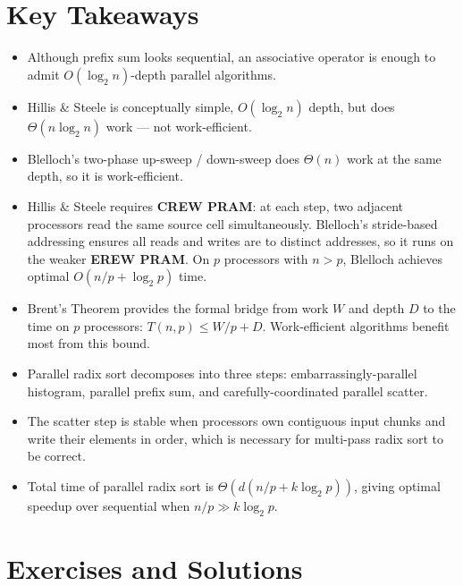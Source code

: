 \section{Key Takeaways}
\begin{itemize}[leftmargin=*]
  \item Although prefix sum looks sequential, an associative operator
        is enough to admit $O(\log_2 n)$-depth parallel algorithms.
  \item Hillis \& Steele is conceptually simple, $O(\log_2 n)$ depth,
        but does $\Theta(n \log_2 n)$ work --- not work-efficient.
  \item Blelloch's two-phase up-sweep / down-sweep does $\Theta(n)$
        work at the same depth, so it is work-efficient.
  \item Hillis \& Steele requires \textbf{CREW PRAM}: at each step,
        two adjacent processors read the same source cell simultaneously.
        Blelloch's stride-based addressing ensures all reads and writes
        are to distinct addresses, so it runs on the weaker \textbf{EREW PRAM}.
        On $p$ processors with $n > p$, Blelloch achieves optimal
        $O(n/p + \log_2 p)$ time.
  \item Brent's Theorem provides the formal bridge from work $W$ and
        depth $D$ to the time on $p$ processors: $T(n,p) \le W/p + D$.
        Work-efficient algorithms benefit most from this bound.
  \item Parallel radix sort decomposes into three steps:
        embarrassingly-parallel histogram, parallel prefix sum, and
        carefully-coordinated parallel scatter.
  \item The scatter step is stable when processors own contiguous input
        chunks and write their elements in order, which is necessary
        for multi-pass radix sort to be correct.
  \item Total time of parallel radix sort is
        $\Theta(d (n/p + k \log_2 p))$, giving optimal speedup over
        sequential when $n/p \gg k \log_2 p$.
\end{itemize}

\section{Exercises and Solutions}
\label{sec:exercises}

